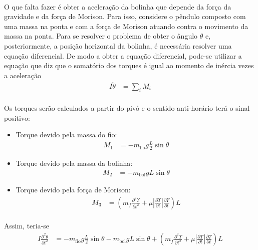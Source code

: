\documentclass[a4paper,11pt]{scrartcl} %
\numberwithin{equation}{section} %
\numberwithin{figure}{section} %
\numberwithin{table}{section} %
\begin{document}
 \paragraph{} O que falta fazer é obter a aceleração da bolinha que depende da força da gravidade e da força de Morison. Para isso, considere o pêndulo composto com uma massa na ponta e com a força de Morison atuando contra o movimento da massa na ponta. Para se resolver o problema de obter o ângulo $\theta$ e, posteriormente, a posição horizontal da bolinha, é necessária resolver uma equação diferencial. De modo a obter a equação diferencial, pode-se utilizar a equação que diz que o somatório dos torques é igual ao momento de inércia vezes a aceleração  \begin{align}
 	I\ddot{\theta} &= \sum_{i} M_i
 \end{align}
 
 \paragraph{} Os torques serão calculados a partir do pivô e o sentido anti-horário terá o sinal positivo: \begin{itemize}
 	\item Torque devido pela massa do fio: \begin{align}
 		M_1 &= -m_{\mathrm{fio}} g \frac{L}{2}\sin\theta
 	\end{align}
 	\item Torque devido pela massa da bolinha: \begin{align}
 		M_2 &= -m_{\mathrm{bol}} g L\sin\theta
 	\end{align}
 	\item Torque devido pela força de Morison: \begin{align}
 		M_3 &= \left(m_f\frac{\partial^2 \Upsilon}{\partial t^2}+\mu\left|\frac{\partial \Upsilon}{\partial t}\right|\frac{\partial \Upsilon}{\partial t}\right)L
 	\end{align}
 \end{itemize}
 
 \paragraph{} Assim, teria-se \begin{align}
 	I\frac{\partial^2 \theta}{\partial t^2} &=-m_{\mathrm{fio}} g \frac{L}{2}\sin\theta -m_{\mathrm{bol}} g L\sin\theta + \left(m_f\frac{\partial^2 \Upsilon}{\partial t^2}+\mu\left|\frac{\partial \Upsilon}{\partial t}\right|\frac{\partial \Upsilon}{\partial t}\right)L
 \end{align}
 
\end{document}
